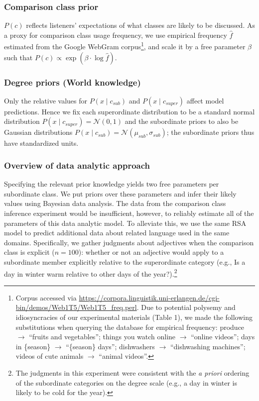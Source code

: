 \documentclass[doc]{apa6}
\begin{document}
\subsubsection{Comparison class prior}

\(P(c)\) reflects listeners' expectations of what classes are likely to
be discussed. As a proxy for comparison class usage frequency, we use
empirical frequency \(\hat{f}\) estimated from the Google WebGram
corpus\footnote{Corpus accessed via
\url{https://corpora.linguistik.uni-erlangen.de/cgi-bin/demos/Web1T5/Web1T5_freq.perl}. Due to potential polysemy and idiosyncracies of our experimental
  materials (Table 1), we made the following substitutions when querying
  the database for empirical frequency: produce $\rightarrow$
  ``fruits and vegetables''; things you watch online
  $\rightarrow$ ``online videos''; days in \{season\}
  $\rightarrow$ ``\{season\} days''; dishwashers $\rightarrow$
  ``dishwashing machines''; videos of cute animals $\rightarrow$
  ``animal videos''.}, and scale it by a free parameter $\beta$
such that $P(c) \propto \exp{(\beta \cdot \log \hat{f})}$.


\subsubsection{Degree priors (World
knowledge)}

Only the relative values for \(P(x \mid c_{sub})\) and
\(P(x \mid c_{super})\) affect model predictions. Hence we fix each
superordinate distribution to be a standard normal distribution
\(P(x \mid c_{super}) = \mathcal{N}(0, 1)\) and the subordinate priors
to also be Gaussian distributions
\(P(x \mid c_{sub}) = \mathcal{N}(\mu_{sub}, \sigma_{sub})\); the
subordinate priors thus have standardized units.

\subsubsection{Overview of data analytic
approach}

Specifying the relevant prior knowledge yields two free parameters per
subordinate class. We put priors over these parameters and infer their
likely values using Bayesian data analysis. The data from the comparison
class inference experiment would be insufficient, however, to reliably
estimate all of the parameters of this data analytic model. To alleviate
this, we use the same RSA model to predict additional data about related
language used in the same domains. Specifically, we gather judgments
about adjectives when the comparison class is explicit (\(n = 100\)):
whether or not an adjective would apply to a subordinate member
explicitly relative to the superordinate category (e.g., Is a day in
winter warm relative to other days of the year?).\footnote{The judgments
  in this experiment were consistent with the \emph{a priori} ordering
  of the subordinate categories on the degree scale (e.g., a day in
  winter is likely to be cold for the year).}
\end{document}
